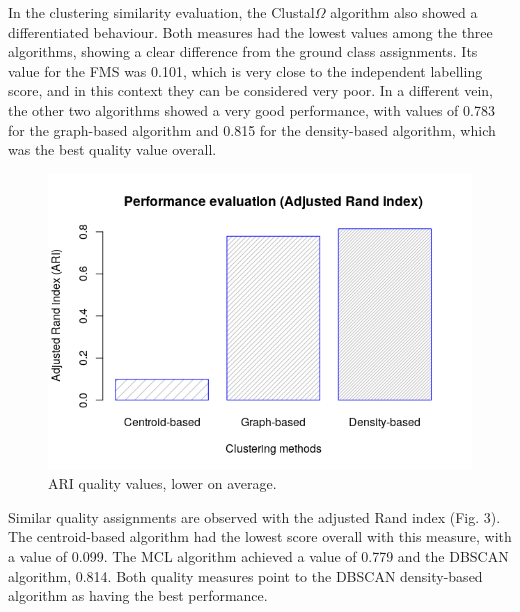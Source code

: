\documentclass[nocrop]{bioinfo}
\begin{document}
In the clustering similarity evaluation, the Clustal$\Omega$ algorithm also showed a differentiated behaviour. Both measures had the lowest values among the three algorithms, showing a clear difference from the ground class assignments. Its value for the FMS was 0.101, which is very close to the independent labelling score, and in this context they can be considered very poor. In a different vein, the other two algorithms showed a very good performance, with values of 0.783 for the graph-based algorithm and 0.815 for the density-based algorithm, which was the best quality value overall. 
\begin{figure}[ht]
\centering
\includegraphics[scale=0.45]{img/ari.png}
\caption{ARI quality values, lower on average.}\label{fig:03}
\end{figure}

Similar quality assignments are observed with the adjusted Rand index (Fig. 3). The centroid-based algorithm had the lowest score overall with this measure, with a value of 0.099. The MCL algorithm achieved a value of 0.779 and the DBSCAN algorithm, 0.814. Both quality measures point to the DBSCAN density-based algorithm as having the best performance.
\end{document}
